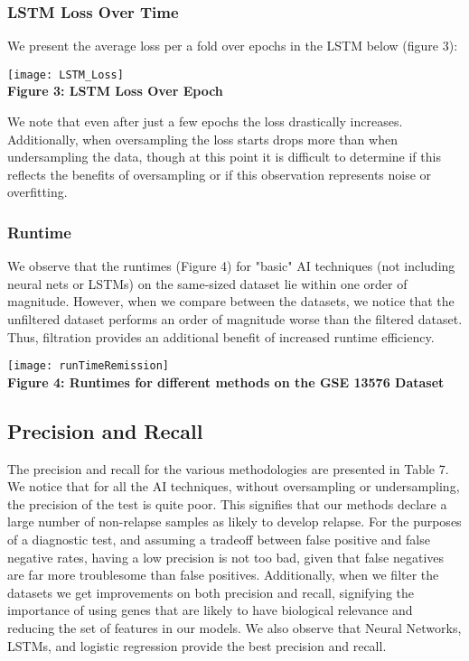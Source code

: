 \documentclass[12pt]{scrartcl}
\begin{document}
    \subsubsection{LSTM Loss Over Time}
    We present the average loss per a fold over epochs in the LSTM below (figure 3):
    
    \begin{center}
    \texttt{[image: LSTM\_Loss]}\\
    \textbf{Figure 3: LSTM Loss Over Epoch}
    \end{center}
    
    We note that even after just a few epochs the loss drastically increases. Additionally, when oversampling the loss starts drops more than when undersampling the data, though at this point it is difficult to determine if this reflects the benefits of oversampling or if this observation represents noise or overfitting. 
    
       
    \subsubsection{Runtime}
    We observe that the runtimes (Figure 4) for "basic" AI techniques (not including neural nets or LSTMs) on the same-sized dataset lie within one order of magnitude. However, when we compare between the datasets, we notice that the unfiltered dataset performs an order of magnitude worse than the filtered dataset. Thus, filtration provides an additional benefit of increased runtime efficiency.
    
    \begin{center}
    \texttt{[image: runTimeRemission]}\\
    \textbf{Figure 4: Runtimes for different methods on the GSE 13576 Dataset}
    \end{center}
    
    
    
    \subsection{Precision and Recall}
    The precision and recall for the various methodologies are presented in Table 7. We notice that for all the AI techniques, without oversampling or undersampling, the precision of the test is quite poor. This signifies that our methods declare a large number of non-relapse samples as likely to develop relapse. For the purposes of a diagnostic test, and assuming a tradeoff between false positive and false negative rates, having a low precision is not too bad, given that false negatives are far more troublesome than false positives. Additionally, when we filter the datasets we get improvements on both precision and recall, signifying the importance of using genes that are likely to have biological relevance and reducing the set of features in our models. We also observe that Neural Networks, LSTMs, and logistic regression provide the best precision and recall. \\
     
\end{document}
